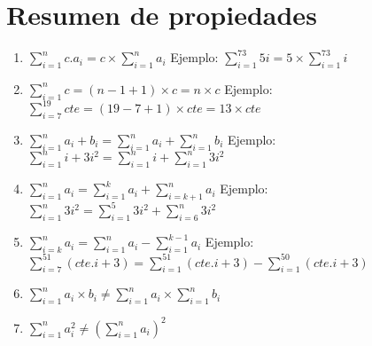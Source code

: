 \section{Resumen de propiedades}

\begin{enumerate}
 \item { $ \sum_{i=1}^n{c. a_i}= c \times \sum_{i=1}^n{ a_i}$ \newline \newline Ejemplo: $\sum_{i=1}^{73}{5i}= 5 \times \sum_{i=1}^{73}{ i}$ }
 \item { $\sum_{i=1}^n{c}=(n-1+1) \times c= n \times c$ \newline \newline Ejemplo: $\sum_{i=7}^{19}{cte} = (19-7+1) \times cte = 13 \times cte$ }
 \item { $\sum_{i=1}^n{a_i+b_i}=\sum_{i=1}^n{ a_i} + \sum_{i=1}^n{b_i}$ \newline \newline Ejemplo: $\sum_{i=1}^n{i+3i^2} =\sum_{i=1}^n{i} + \sum_{i=1}^n{3i^2}$ }
 \item { $\sum_{i=1}^n{a_i}=\sum_{i=1}^k{a_i} + \sum_{i=k+1}^n{a_i}$ \newline \newline Ejemplo: $ \sum_{i=1}^n{3i^2} =\sum_{i=1}^5{3i^2} + \sum_{i=6}^n{3i^2} $}
 \item { $\sum_{i=k}^n{a_i}=\sum_{i=1}^n{a_i} - \sum_{i=1}^{k-1}{a_i} $ \newline \newline Ejemplo: $  \sum_{i=7}^{51}{(cte.i+3)} = \sum_{i=1}^{51}{(cte.i+3)} - \sum_{i=1}^{50}{(cte.i+3)} $}
 \item { $\sum_{i=1}^n{a_i \times b_i} \not= \sum_{i=1}^n{ a_i} \times \sum_{i=1}^n{b_i} $ }
 \item { $\sum_{i=1}^n{a_i^2} \not= (\sum_{i=1}^n{ a_i})^2$ }
\end{enumerate}
